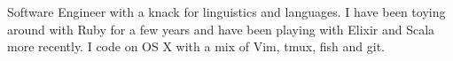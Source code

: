 

\begin{cvparagraph}

Software Engineer with a knack for linguistics and languages. I have been
toying around with Ruby for a few years and have been playing with Elixir and
Scala more recently. I code on OS X with a mix of Vim, tmux, fish and git.
\end{cvparagraph}
